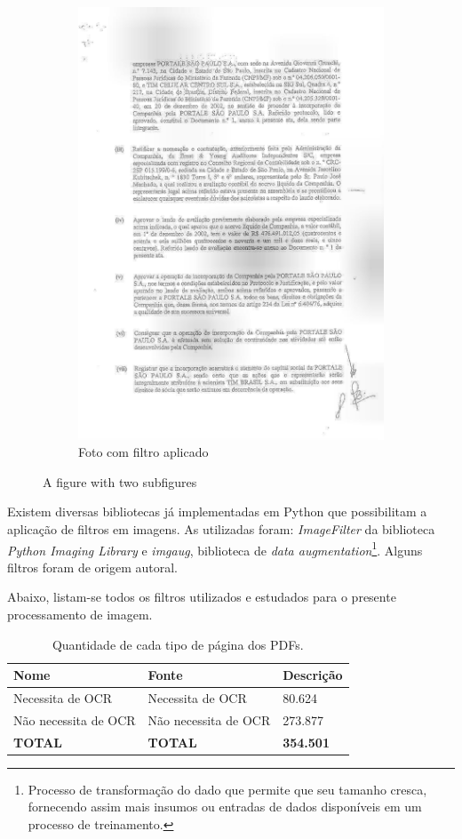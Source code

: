 \begin{figure}[H]
\begin{subfigure}{.5\textwidth}
    \includegraphics[width=0.8\linewidth]{figuras/image-with-overlay.jpg}
    \caption{Foto com filtro aplicado}
    \label{fig:image-with-filter}
  \end{subfigure}
  \caption{A figure with two subfigures}
  \label{fig:side-process-images}
\end{figure}

Existem diversas bibliotecas já implementadas em Python que possibilitam a aplicação de filtros em imagens. As utilizadas foram: \textit{ImageFilter} da biblioteca \textit{Python Imaging Library} e \textit{imgaug}, biblioteca de \textit{data augmentation}\footnote{
  Processo de transformação do dado que permite que seu tamanho cresca, fornecendo assim mais insumos ou entradas de dados disponíveis em um processo de treinamento.
}. Alguns filtros foram de origem autoral.

Abaixo, listam-se todos os filtros utilizados e estudados para o presente processamento de imagem.

\begin{table}[H]
  \centering
  \caption{Quantidade de cada tipo de página dos PDFs.}
  \begin{tabular}{|m{.2\linewidth}|m{.2\linewidth}|m{.5\linewidth}|}
    \hline
      \textbf{Nome}  &
      \textbf{Fonte}  &
      \textbf{Descrição} \\
    \hline
      Necessita de OCR  &
      Necessita de OCR  &
      80.624 \\
    \hline
      Não necessita de OCR  &
      Não necessita de OCR  &
      273.877 \\
    \hline
      \textbf{TOTAL}  &
      \textbf{TOTAL}  &
      \textbf{354.501} \\
    \hline
  \end{tabular}
  \label{tab:sdas}
\end{table}

